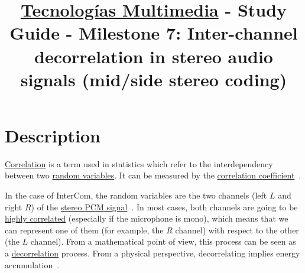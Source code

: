 \title{\href{https://www.ual.es/estudios/grados/presentacion/plandeestudios/asignatura/4015/40154321?idioma=zh_CN}{Tecnologías Multimedia} - Study Guide - Milestone 7: Inter-channel decorrelation in stereo audio signals (mid/side stereo coding)}

\maketitle

\section{Description}

\href{https://en.wikipedia.org/wiki/Correlation_and_dependence}{Correlation}
is a term used in statistics which refer to the interdependency
between two \href{https://en.wikipedia.org/wiki/Random_variable}{random
  variables}. It can be measured by the
\href{https://www.mathsisfun.com/data/correlation.html}{correlation
  coefficient}~\cite{thinkstats}.

In the case of InterCom, the random variables are the two channels
(left $L$ and right $R$) of the
\href{https://en.wikipedia.org/wiki/Stereophonic_sound}{stereo
  \href{https://en.wikipedia.org/wiki/Pulse-code_modulation}{PCM}
  signal}~\cite{bosi2003intro}. In most cases, both channels are going
to be \href{https://en.wikipedia.org/wiki/Binaural_recording}{highly
  correlated} (especially if the microphone is mono), which means that
we can represent one of them (for example, the $R$ channel) with
respect to the other (the $L$ channel). From a mathematical point of
view, this process can be seen as a
\href{https://en.wikipedia.org/wiki/Decorrelation}{decorrelation}
process. From a physical perspective, decorrelating implies energy
accumulation~\cite{sayood2017introduction}.

